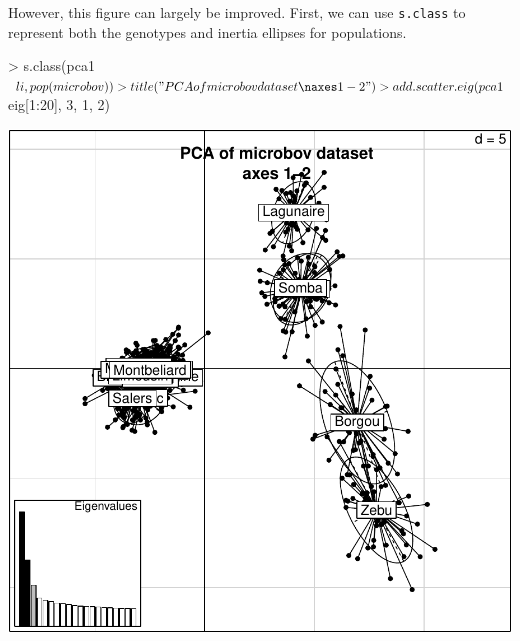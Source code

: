 \documentclass{article}
\begin{document}
\noindent However, this figure can largely be improved.
First, we can use \texttt{s.class} to represent both the genotypes and inertia ellipses for populations.
\begin{Schunk}
\begin{Sinput}
> s.class(pca1$li, pop(microbov))
> title("PCA of microbov dataset\naxes 1-2")
> add.scatter.eig(pca1$eig[1:20], 3, 1, 2)
\end{Sinput}
\end{Schunk}
\includegraphics{figs/base-076}
\end{document}
